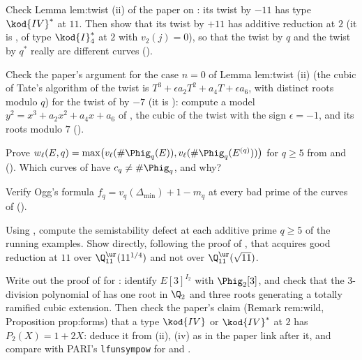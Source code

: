 \begin{exercise}\label{exer:reduction:twist121}
Check Lemma lem:twist (ii) of the paper on : its twist by $-11$ has type $\kod{IV}^*$ at $11$. Then show that its twist
by $+11$ has additive reduction at $2$ (it is , of type $\kod{I}_4^*$ at $2$ with $v_2(j)=0$), so that the twist by $q$ and the
twist by $q^*$ really are different curves ().
\end{exercise}

\begin{exercise}\label{exer:reduction:cubic}
Check the paper's argument for the case $n=0$ of Lemma lem:twist (ii) (the cubic of Tate's algorithm of the twist is
$T^3+\epsilon a_2T^2+a_4T+\epsilon a_6$, with distinct roots modulo $q$) for the twist of
 by $-7$ (it is ): compute a model $y^2=x^3+a_2x^2+a_4x+a_6$ of , the cubic of the twist with the sign
$\epsilon=-1$, and its roots modulo $7$ ().
\end{exercise}

\begin{exercise}\label{exer:reduction:weight}
Prove $w_\ell(E,q)=\max\bigl(v_\ell(\#\Phig_q(E)),v_\ell(\#\Phig_q(E^{(q)}))\bigr)$ for $q\ge5$ from  and
 (). Which curves of  have
$c_q\ne\#\Phig_q$, and why?
\end{exercise}

\begin{exercise}\label{exer:reduction:ogg}
Verify Ogg's formula $f_q=v_q(\Delta_{\min})+1-m_q$ at every bad prime of the curves of 
().
\end{exercise}

\begin{exercise}\label{exer:reduction:defects}
Using , compute the semistability defect at each additive prime $q\ge5$ of the running examples. Show directly,
following the proof of , that  acquires good reduction at $11$ over $\Q_{11}^{\ur}(11^{1/4})$ and not over
$\Q_{11}^{\ur}(\sqrt{11})$.
\end{exercise}

\begin{exercise}\label{exer:reduction:IV2}
Write out the proof of  for : identify $E[3]^{I_2}$ with $\Phig_2[3]$, and check that the $3$-division
polynomial of  has one root in $\Q_2$ and three roots generating a totally ramified cubic extension. Then check the paper's claim
(Remark rem:wild, Proposition prop:forms) that a type $\kod{IV}$ or $\kod{IV}^*$ at $2$ has $P_2(X)=1+2X$: deduce it from
(ii), (iv) as in the paper link after it, and compare with PARI's \texttt{lfunsympow} for  and
.
\end{exercise}

